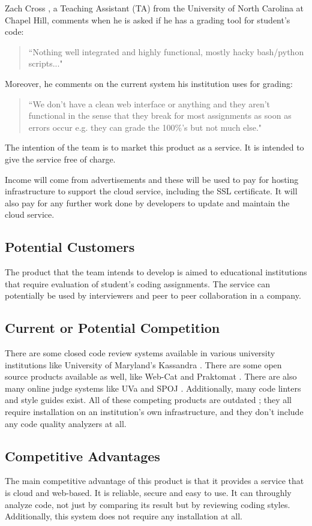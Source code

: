 
Zach Cross \cite{Zach}, a Teaching Assistant (TA) from the University of North
Carolina at Chapel Hill, comments when he is asked if he has a grading tool
for student's code: \begin{quote} ``Nothing well integrated and highly
functional, mostly hacky bash/python scripts..." \end{quote} Moreover, he
comments on the current system his institution uses for grading: \begin{quote}
``We don't have a clean web interface or anything and they aren't functional
in the sense that they break for most assignments as soon as errors occur e.g.
they can grade the 100\%'s but not much else." \end{quote}

The intention of the team is to market this product as a service. It is intended
to give the service free of charge.

Income will come from advertisements and these will be used to pay for hosting
infrastructure to support the cloud service, including the SSL certificate. It
will also pay for any further work done by developers to update and maintain the
cloud service.

\subsection{Potential Customers}

The product that the team intends to develop is aimed to educational
institutions that require evaluation of student's coding assignments. The
service can potentially be used by interviewers and peer to peer collaboration
in a company.

\subsection{Current or Potential Competition}

There are some closed code review systems available in various university
institutions like University of Maryland's Kassandra \cite{Matt1994}. There are
some open source products available as well, like Web-Cat \cite{WebCat} and
Praktomat \cite{Praktomat}. There are also many online judge systems like UVa
\cite{UVA} and SPOJ \cite{SPOJ}. Additionally, many code linters and style
guides exist. All of these competing products are outdated
; they all require
installation on an institution's own infrastructure, and they don't include any
code quality analyzers at all.

\subsection{Competitive Advantages}

The main competitive advantage of this product is that it provides a service
that is cloud and web-based. It is reliable, secure and easy to use. It can
throughly analyze code, not just by comparing its result but by reviewing coding
styles. Additionally, this system does not require any installation at all.
